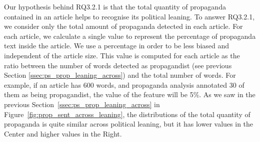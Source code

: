 Our hypothesis behind RQ3.2.1 is that the total quantity of propaganda contained in an article helps to recognise its political leaning. 
To answer RQ3.2.1, we
consider only the total amount of propaganda detected in each article. For each article, we calculate a single value to represent the percentage of propaganda text inside the article. %
We use a percentage in order to be less biased and independent of the article size.
This value is computed for each article as the ratio between the number of words detected as propagandist (see previous Section \ref{ssec:ps_prop_leaning_across}) and the total number of words. For example, if an article has 600 words, and propaganda analysis annotated 30 of them as being propagandist, the value of the feature will be 5\%.  
As we saw in the previous Section~\ref{ssec:ps_prop_leaning_across} in Figure~\ref{fig:prop_sent_across_leaning}, the distributions of the total quantity of propaganda is quite similar across political leaning, but it has lower values in the Center and higher values in the Right.


